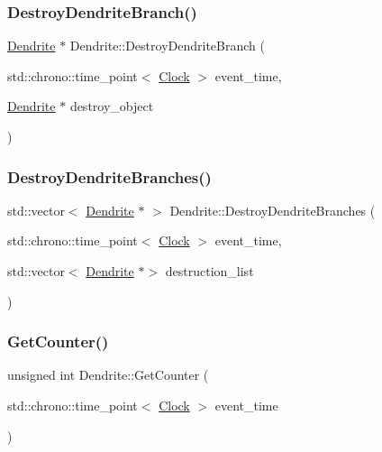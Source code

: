 \mbox{\label{classDendrite_a87887a43ac38e762255da18eaaee43f5}} 
\subsubsection{\texorpdfstring{Destroy\+Dendrite\+Branch()}{DestroyDendriteBranch()}}
{\footnotesize\ttfamily \mbox{\hyperlink{classDendrite}{Dendrite}} $\ast$ Dendrite\+::\+Destroy\+Dendrite\+Branch (\begin{DoxyParamCaption}\item[{std\+::chrono\+::time\+\_\+point$<$ \mbox{\hyperlink{universe_8h_a0ef8d951d1ca5ab3cfaf7ab4c7a6fd80}{Clock}} $>$}]{event\+\_\+time,  }\item[{\mbox{\hyperlink{classDendrite}{Dendrite}} $\ast$}]{destroy\+\_\+object }\end{DoxyParamCaption})}

\mbox{\label{classDendrite_a92c08afc374068922e462c9b65cf9157}} 
\subsubsection{\texorpdfstring{Destroy\+Dendrite\+Branches()}{DestroyDendriteBranches()}}
{\footnotesize\ttfamily std\+::vector$<$ \mbox{\hyperlink{classDendrite}{Dendrite}} $\ast$ $>$ Dendrite\+::\+Destroy\+Dendrite\+Branches (\begin{DoxyParamCaption}\item[{std\+::chrono\+::time\+\_\+point$<$ \mbox{\hyperlink{universe_8h_a0ef8d951d1ca5ab3cfaf7ab4c7a6fd80}{Clock}} $>$}]{event\+\_\+time,  }\item[{std\+::vector$<$ \mbox{\hyperlink{classDendrite}{Dendrite}} $\ast$$>$}]{destruction\+\_\+list }\end{DoxyParamCaption})}

\mbox{\label{classDendrite_afa65091d7bbeed3f16a3e71a687fdec3}} 
\subsubsection{\texorpdfstring{Get\+Counter()}{GetCounter()}}
{\footnotesize\ttfamily unsigned int Dendrite\+::\+Get\+Counter (\begin{DoxyParamCaption}\item[{std\+::chrono\+::time\+\_\+point$<$ \mbox{\hyperlink{universe_8h_a0ef8d951d1ca5ab3cfaf7ab4c7a6fd80}{Clock}} $>$}]{event\+\_\+time }\end{DoxyParamCaption})\hspace{0.3cm}{\ttfamily [inline]}}

